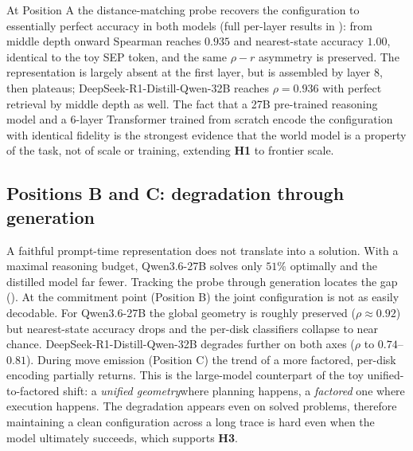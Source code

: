 \documentclass{article} %
\begin{document}
At Position A the distance-matching probe recovers the configuration to essentially perfect accuracy in both models (full per-layer results in ): from middle depth onward Spearman reaches $0.935$ and nearest-state accuracy $1.00$, identical to the toy SEP token, and the same $\rho{-}r$ asymmetry is preserved. The representation is largely absent at the first layer, but is assembled by layer 8, then plateaus; DeepSeek-R1-Distill-Qwen-32B reaches $\rho=0.936$ with perfect retrieval by middle depth as well. The fact that a 27B pre-trained reasoning model and a 6-layer Transformer trained from scratch encode the configuration with identical fidelity is the strongest evidence that the world model is a property of the task, not of scale or training, extending \textbf{H1} to frontier scale.

\subsection{Positions B and C: degradation through generation}
\label{sec:lrm-posBC}

A faithful prompt-time representation does not translate into a solution. With a maximal reasoning budget, Qwen3.6-27B solves only $51\%$ optimally and the distilled model far fewer. Tracking the probe through generation locates the gap (). At the commitment point (Position B) the joint configuration is not as easily decodable. For Qwen3.6-27B the global geometry is roughly preserved ($\rho\approx0.92$) but nearest-state accuracy drops and the per-disk classifiers collapse to near chance. DeepSeek-R1-Distill-Qwen-32B degrades further on both axes ($\rho$ to $0.74$--$0.81$). During move emission (Position C) the trend of a more factored, per-disk encoding partially returns. This is the large-model counterpart of the toy unified-to-factored shift: a \emph{unified geometry}where planning happens, a \emph{factored} one where execution happens. The degradation appears even on solved problems, therefore maintaining a clean configuration across a long trace is hard even when the model ultimately succeeds, which supports \textbf{H3}.
\end{document}
